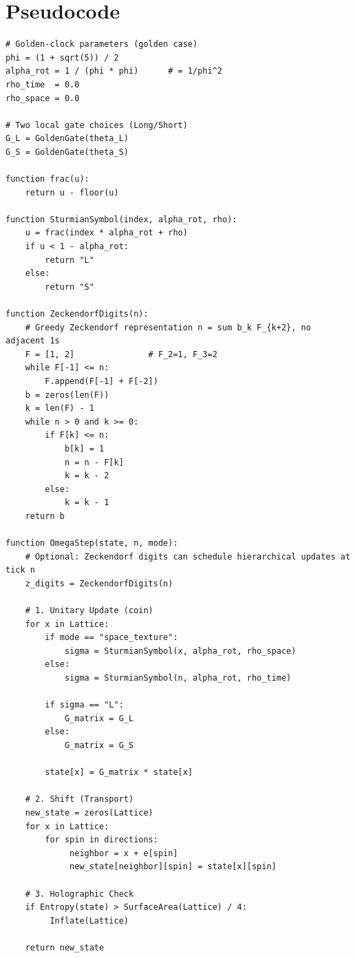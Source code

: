 \section{Pseudocode}
\label{app:reference}
\begin{verbatim}
# Golden-clock parameters (golden case)
phi = (1 + sqrt(5)) / 2
alpha_rot = 1 / (phi * phi)      # = 1/phi^2
rho_time  = 0.0
rho_space = 0.0

# Two local gate choices (Long/Short)
G_L = GoldenGate(theta_L)
G_S = GoldenGate(theta_S)

function frac(u):
    return u - floor(u)

function SturmianSymbol(index, alpha_rot, rho):
    u = frac(index * alpha_rot + rho)
    if u < 1 - alpha_rot:
        return "L"
    else:
        return "S"

function ZeckendorfDigits(n):
    # Greedy Zeckendorf representation n = sum b_k F_{k+2}, no adjacent 1s
    F = [1, 2]               # F_2=1, F_3=2
    while F[-1] <= n:
        F.append(F[-1] + F[-2])
    b = zeros(len(F))
    k = len(F) - 1
    while n > 0 and k >= 0:
        if F[k] <= n:
            b[k] = 1
            n = n - F[k]
            k = k - 2
        else:
            k = k - 1
    return b

function OmegaStep(state, n, mode):
    # Optional: Zeckendorf digits can schedule hierarchical updates at tick n
    z_digits = ZeckendorfDigits(n)

    # 1. Unitary Update (coin)
    for x in Lattice:
        if mode == "space_texture":
            sigma = SturmianSymbol(x, alpha_rot, rho_space)
        else:
            sigma = SturmianSymbol(n, alpha_rot, rho_time)

        if sigma == "L":
            G_matrix = G_L
        else:
            G_matrix = G_S

        state[x] = G_matrix * state[x]

    # 2. Shift (Transport)
    new_state = zeros(Lattice)
    for x in Lattice:
        for spin in directions:
             neighbor = x + e[spin]
             new_state[neighbor][spin] = state[x][spin]

    # 3. Holographic Check
    if Entropy(state) > SurfaceArea(Lattice) / 4:
         Inflate(Lattice)

    return new_state
\end{verbatim}

